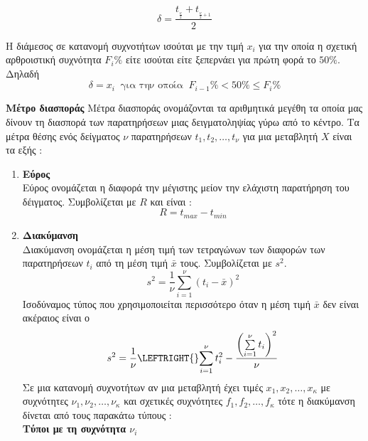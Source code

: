 \documentclass[twoside,nofonts,internet,math,spyros]{frontisthrio}
\newcommand{\ml}[1]{\setlength{\columnseprule}{#1pt}}
\begin{document}
\begin{arithmisi}
\begin{enumerate}[label=\bf\arabic*.,itemsep=0mm]
\begin{rlist}
\[ \delta=\frac{t_{_{\frac{\nu}{2}}}+t_{_{\frac{\nu}{2}+1}}}{2} \]
\end{rlist}
Η διάμεσος σε κατανομή συχνοτήτων ισούται με την τιμή $ x_i $ για την οποία η σχετική αρθροιστική συχνότητα $ F_i\% $ είτε ισούται είτε ξεπερνάει για πρώτη φορά το $ 50\% $. Δηλαδή
\[ \delta=x_i\ \textrm{ για την οποία }\ F_{i-1}\%<50\%\leq F_i\% \]
\end{enumerate}
\item\textbf{Μέτρο διασποράς}
Μέτρα διασποράς ονομάζονται τα αριθμητικά μεγέθη τα οποία μας δίνουν τη διασπορά των παρατηρήσεων μιας δειγματοληψίας γύρω από το κέντρο. Τα μέτρα θέσης ενός δείγματος $ \nu $ παρατηρήσεων $ t_1,t_2,\ldots,t_\nu $ για μια μεταβλητή $ X $ είναι τα εξής :
\begin{enumerate}[label=\bf\arabic*.,itemsep=0mm]
\item \textbf{Εύρος}\\
Εύρος ονομάζεται η διαφορά την μέγιστης μείον την ελάχιστη παρατήρηση του δέιγματος. Συμβολίζεται με $ R $ και είναι :
\[ R=t_{max}-t_{min} \]
\item \textbf{Διακύμανση}\\
Διακύμανση ονομάζεται η μέση τιμή των τετραγώνων των διαφορών των παρατηρήσεων $ t_i $ από τη μέση τιμή $ \bar{x} $ τους. Συμβολίζεται με $ s^2 $.
\[ s^2=\frac{1}{\nu}\sum_{i=1}^{\nu}{(t_i-\bar{x})^2} \]
Ισοδύναμος τύπος που χρησιμοποιείται περισσότερο όταν η μέση τιμή $\bar{x}$ δεν είναι ακέραιος είναι ο
\[s^2=\frac{1}{\nu}\LEFTRIGHT\{\}{\sum\limits_{i=1}^{\nu}{t_i^2}-\frac{\left( \sum\limits_{i=1}^{\nu}{t_i}\right)^2 }{\nu}}\]
Σε μια κατανομή συχνοτήτων αν μια μεταβλητή έχει τιμές $ x_1,x_2,\ldots,x_\kappa $ με συχνότητες $ \nu_1,\nu_2,\ldots,\nu_\kappa $ και σχετικές συχνότητες $ f_1,f_2,\ldots,f_\kappa $ τότε η διακύμανση δίνεται από τους παρακάτω τύπους :\\
\ml{0}
\textbf{Τύποι με τη συχνότητα $\nu_i$}
\begin{rlist}[resume]
\end{rlist}

\end{enumerate}
\end{arithmisi}
\end{document}
